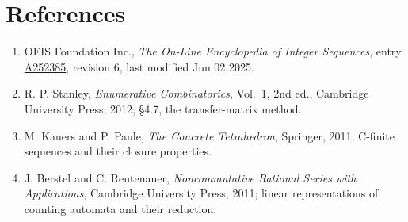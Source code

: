 \documentclass[11pt]{article}
\theoremstyle{definition}
\begin{document}
\section{References}

\begin{enumerate}

\item OEIS Foundation Inc., \emph{The On-Line Encyclopedia of Integer Sequences}, entry \href{https://oeis.org/A252385}{A252385}, revision 6, last modified Jun 02 2025.

\item R. P. Stanley, \emph{Enumerative Combinatorics}, Vol.~1, 2nd ed., Cambridge University Press, 2012; \S4.7, the transfer-matrix method.

\item M. Kauers and P. Paule, \emph{The Concrete Tetrahedron}, Springer, 2011; C-finite sequences and their closure properties.

\item J. Berstel and C. Reutenauer, \emph{Noncommutative Rational Series with Applications}, Cambridge University Press, 2011; linear representations of counting automata and their reduction.

\end{enumerate}
\end{document}
